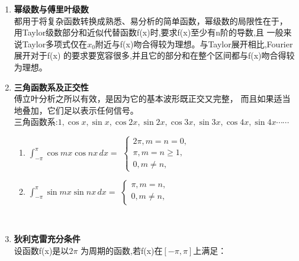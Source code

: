 \documentclass[12pt]{scrartcl}
\begin{document}
{\begin{enumerate}
    \hspace*{0.7cm}除了纯数学之外，主要的受益者不是热力学，而是工程学，特别是电子工程。
    傅里叶变换已经成为科学和工程中的常规工具;它的应用包括从声音记录中去除噪音;利用x射线衍
    射发现DNA等大型生物化学分子的结构;改善无线电接收，处理从空中拍摄的照片。
    \begin{figure}[htbp]
        \centering
        \texttt{[image: p2.png]}
        \end{figure}
    \item \textbf{幂级数与傅里叶级数}\\
    \hspace*{0.7cm}都用于将复杂函数转换成熟悉、易分析的简单函数，幂级数的局限性在于，
    用Taylor级数部分和近似代替函数f(x)时,要求f(x)至少有n阶的导数,且
    一般来说Taylor多项式仅在$x_0$附近与f(x)吻合得较为理想。与Taylor展开相比,Fourier展开对于f(x)
    的要求要宽容很多,并且它的部分和在整个区间都与f(x)吻合得较为理想。\\
    \item  \textbf{三角函数系及正交性}\\
    \hspace*{0.7cm}傅立叶分析之所以有效，是因为它的基本波形既正交又完整，
    而且如果适当地叠加，它们足以表示任何信号。\\
    三角函数系:\quad $1,\cos x,\sin x,\cos 2x,\sin 2x,\cos 3x,\sin 3x,\cos 4x,\sin 4x\cdots \cdots $
    \begin{enumerate}
        \item 
            $\int_{-\pi }^{\pi } \cos mx\cos nx \,dx= $
            $\left\{
            \begin{array}{lr}
            2\pi,m=n=0, &  \\
            \pi,m=n\geq 1,\\
            0,m\neq n, &  
            \end{array}
            \right.$
        \item 
            $\int_{-\pi }^{\pi } \sin mx\sin nx \,dx= $
            $\left\{
            \begin{array}{lr}
            \pi,m=n, &  \\
            0,m\neq n, &  
            \end{array}
            \right.$
    \end{enumerate}
~\\
    \item  \textbf{狄利克雷充分条件}\\
    设函数f(x)是以$2\pi$ 为周期的函数,若f(x)在$[-\pi,\pi]$上满足：

\end{enumerate}}
\end{document}
